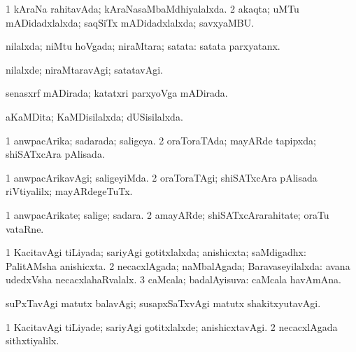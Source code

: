 \bentry
{} 
\gl{\gu}
\expl{}
\bmng
\bnum
\num{1} kAraNa rahitavAda; kAraNasaMbaMdhiyalalxda. 
\num{2} akaqta; uMTu mADidadxlalxda; saqSiTx mADidadxlalxda; savxyaMBU. 
\enum
\emng
\eentry

\bentry
{} 
\gl{\gu}
\expl{}
\bmng
nilalxda; niMtu hoVgada; niraMtara; satata:  satata parxyatanx. 
\emng
\eentry

\bentry
{} 
\gl{\kirxvi}
\expl{}
\bmng
nilalxde; niraMtaravAgi; satatavAgi. 
\emng
\eentry

\bentry
{} 
\gl{\gu}
\expl{}
\bmng
senasxrf mADirada; katatxri parxyoVga mADirada. 
\emng
\eentry

\bentry
{} 
\gl{\gu}
\expl{}
\bmng
aKaMDita; KaMDisilalxda; dUSisilalxda. 
\emng
\eentry

\bentry
{} 
\gl{\gu}
\expl{}
\bmng
\bnum
\num{1} anwpacArika; sadarada; saligeya. 
\num{2} oraToraTAda; mayARde tapipxda; shiSATxcAra pAlisada. 
\enum
\emng
\eentry

\bentry
{} 
\gl{\kirxvi}
\expl{}
\bmng
\bnum
\num{1} anwpacArikavAgi; saligeyiMda. 
\num{2} oraToraTAgi; shiSATxcAra pAlisada riVtiyalilx; mayARdegeTuTx. 
\enum
\emng
\eentry

\bentry
{} 
\gl{\nA}
\expl{}
\bmng
\bnum
\num{1} anwpacArikate; salige; sadara. 
\num{2} amayARde; shiSATxcArarahitate; oraTu vataRne. 
\enum
\emng
\eentry

\bentry
{} 
\gl{\gu}
\expl{}
\bmng
\bnum
\num{1} KacitavAgi tiLiyada; sariyAgi gotitxlalxda; anishicxta; saMdigadhx:  PalitAMsha anishicxta. 
\num{2} necacxlAgada; naMbalAgada; Baravaseyilalxda:  avana udedxVsha necacxlahaRvalalx. 
\num{3} caMcala; badalAyisuva:  caMcala havAmAna. 
\enum
\emng

\noindent 
\gl{\pagu}
\expl{}
\bmng
{} suPxTavAgi matutx balavAgi; susapxSaTxvAgi matutx shakitxyutavAgi. 
\emng
\eentry

\bentry
{} 
\gl{\kirxvi}
\expl{}
\bmng
\bnum
\num{1} KacitavAgi tiLiyade; sariyAgi gotitxlalxde; anishicxtavAgi. 
\num{2} necacxlAgada sithxtiyalilx. 
\enum
\emng
\eentry

